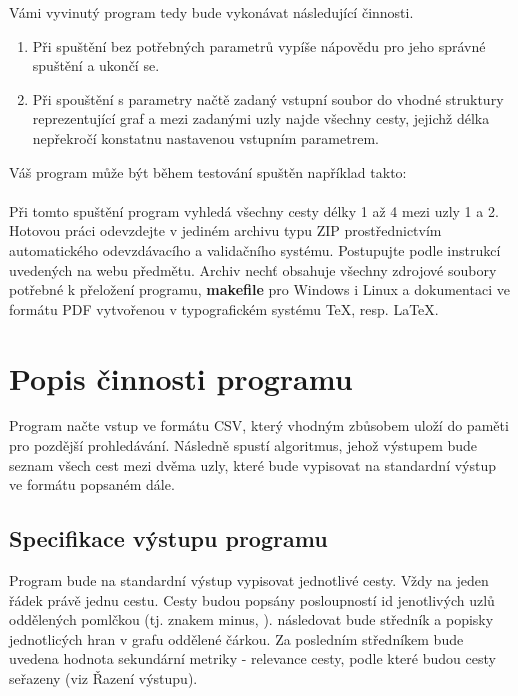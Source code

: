 Vámi vyvinutý program tedy bude vykonávat následující činnosti.
\begin{enumerate}
\item Při spuštění bez potřebných parametrů vypíše nápovědu pro jeho správné spuštění a ukončí se.
\item Při spouštění s parametry načtě zadaný vstupní soubor do vhodné struktury reprezentující graf a mezi zadanými uzly najde všechny cesty, jejichž délka nepřekročí konstatnu nastavenou vstupním parametrem.
\end{enumerate}

Váš program může být během testování spuštěn například takto:\\

\\

Při tomto spuštění program vyhledá všechny cesty délky 1 až 4 mezi uzly 1 a 2.\\

Hotovou práci odevzdejte v jediném archivu typu ZIP prostřednictvím automatického odevzdávacího a validačního systému. Postupujte podle instrukcí uvedených na webu předmětu. Archiv nechť obsahuje všechny zdrojové soubory potřebné k přeložení programu, \textbf{makefile} pro Windows i Linux a dokumentaci ve formátu PDF vytvořenou v typografickém systému \TeX, resp. \LaTeX.

\section{Popis činnosti programu}
Program načte vstup ve formátu CSV, který vhodným zbůsobem uloží do paměti pro pozdější prohledávání. Následně spustí algoritmus, jehož výstupem bude seznam všech cest mezi dvěma uzly, které bude vypisovat na standardní výstup ve formátu popsaném dále.

\subsection{Specifikace výstupu programu}
Program bude na standardní výstup vypisovat jednotlivé cesty. Vždy na jeden řádek právě jednu cestu. Cesty budou popsány posloupností id jenotlivých uzlů oddělených pomlčkou (tj. znakem minus,  \uv{\textbf{-}}). následovat bude středník a popisky jednotlicých hran v grafu oddělené čárkou. Za posledním středníkem bude uvedena hodnota sekundární metriky - relevance cesty, podle které budou cesty seřazeny (viz Řazení výstupu).\\

